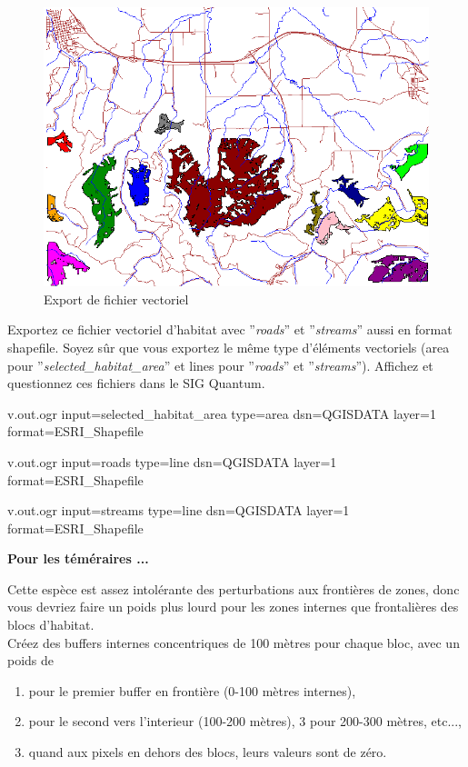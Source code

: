 \begin{figure}[htbp]
   \centering
   \includegraphics[scale=0.35]{grass024.png}
   \caption{Export de fichier vectoriel}
   \label{fig:grass024}
\end{figure}

Exportez ce fichier vectoriel d'habitat avec ''\textit{roads}'' et ''\textit{streams}'' aussi en format shapefile. Soyez s\^ur que vous exportez le m\^eme type d'\'el\'ements vectoriels (area pour ''\textit{selected\_habitat\_area}'' et lines pour ''\textit{roads}'' et ''\textit{streams}''). Affichez et questionnez ces fichiers dans le SIG Quantum.

\begin{smallverbatim}
v.out.ogr input=selected_habitat_area type=area
 dsn=QGISDATA layer=1 format=ESRI_Shapefile

v.out.ogr input=roads type=line dsn=QGISDATA
 layer=1 format=ESRI_Shapefile

v.out.ogr input=streams type=line dsn=QGISDATA
 layer=1 format=ESRI_Shapefile
\end{smallverbatim}

\noindent \textbf{Pour les t\'em\'eraires ...}

Cette esp\`ece est assez intol\'erante des perturbations aux fronti\`eres de zones, donc vous devriez faire un poids plus lourd pour les zones internes que frontali\`eres des blocs d'habitat. \\
Cr\'eez des buffers internes concentriques de 100 m\`etres pour chaque bloc, avec un poids de 
\begin{enumerate}
\item pour le premier buffer en fronti\`ere (0-100 m\`etres internes), 
\item pour le second vers l'interieur (100-200 m\`etres), 3 pour 200-300 m\`etres, etc..., 
\item quand aux pixels en dehors des blocs, leurs valeurs sont de z\'ero.
\end{enumerate}

